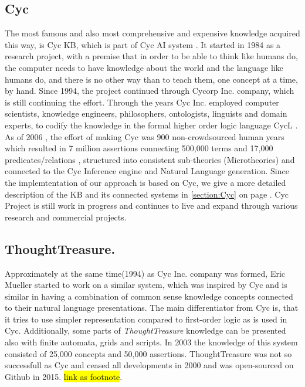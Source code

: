 \subsection{Cyc} The most famous and also most comprehensive and expensive 
knowledge acquired this way, is Cyc KB, which is part of Cyc AI system 
\parencite{Lenat1995}. It started in 1984 as a research project, with a premise 
that in order to be able to think like humans do, the computer needs to have 
knowledge about the world and the language like humans do, and there is no other
way than to teach them, one concept at a time, by hand. Since 1994, the project 
continued through Cycorp Inc. company, which is still continuing the effort. 
Through the years Cyc Inc. employed computer scientists, knowledge engineers, 
philosophers, ontologists, linguists and domain experts, to codify the knowledge
in the formal higher order logic language CycL \parencite{Matuszek2006a}. As of 
2006 \parencite{Matuszek2006}, the effort of making Cyc was 900 non-crowdsourced 
human years which resulted in 7 million assertions connecting 500,000 terms and 
17,000 predicates/relations \parencite{Zang2013}, structured into consistent 
sub-theories (Microtheories) and connected to the Cyc Inference engine and 
Natural Language generation. Since the implemtentation of our approach is based
on Cyc, we give a more detailed description of the KB and its connected systems
in \autoref{section:Cyc} on page \pageref{section:Cyc}. Cyc Project is still 
work in progress and continues to live and expand through various research and
commercial projects.

\subsection{ThoughtTreasure.} Approximately at the same time(1994) as Cyc Inc. 
company was formed, Eric Mueller started to work on a similar system, which was
inspired by Cyc and is similar in having a combination of common sense knowledge
concepts connected to their natural language presentations. The main 
differentiator from Cyc is, that it tries to use simpler representation compared
to first-order logic as is used in Cyc. Additionally, some parts of 
\emph{ThoughtTreasure} knowledge can be presented also with finite automata, 
grids and scripts\parencite{Mueller1999,Mueller2003}. In 2003 the knowledge of
this system consisted of 25,000 concepts and 50,000 assertions. ThoughtTreasure 
was not so successfull as Cyc and ceased all developments in 2000 and was 
open-sourced on Github in 2015. \hl{link as footnote}.

